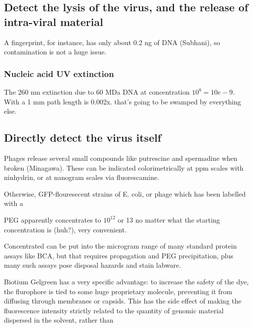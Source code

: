 \documentclass[paper.tex]{subfiles}
\begin{document}
\subsection{Detect the lysis of the virus, and the release of intra-viral material}

A fingerprint, for instance, has only about 0.2 ng of DNA (Subhani), so contamination is not a huge issue.



\subsubsection{Nucleic acid UV extinction }

The 260 nm extinction due to 60 MDa DNA at concentration $10^8 = 10e-9$. With a 1 mm path length is 0.002x. that's going to be swamped by everything else.


\subsection{Directly detect the virus itself}

Phages release several small compounds like putrescine and spermadine when broken (Minagawa\cite{characteristics1961}). These can be indicated colorimetrically at ppm scales with ninhydrin, or at nanogram scales via fluorescamine. 

Otherwise, GFP-flouresecent strains of E. coli, or phage which has been labelled with a 




PEG apparently concentrates to $10^{12}$ or 13 no matter what the starting concentration is (huh?), very convenient.

Concentrated can be put into the microgram range of many standard protein assays like BCA, but that requires propagation and PEG precipitation, plus many such assays pose disposal hazards and stain labware. 












Biotium Gelgreen has a very specific advantage: to increase the safety of the dye, the flurophore is tied to some huge proprietary molecule, preventing it from diffusing through membranes or capsids. This has the side effect of making the fluorescence intensity strictly related to the quantity of genomic material dispersed in the solvent, rather than 
\end{document}
